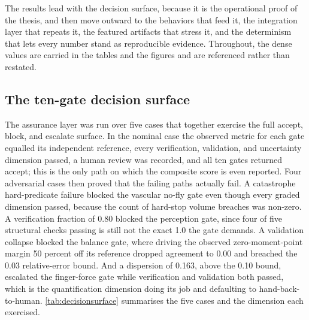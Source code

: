 
The results lead with the decision surface, because it is the operational proof
of the thesis, and then move outward to the behaviors that feed it, the
integration layer that repeats it, the featured artifacts that stress it, and the
determinism that lets every number stand as reproducible evidence. Throughout,
the dense values are carried in the tables and the figures and are referenced
rather than restated.

\subsection{The ten-gate decision surface}

The assurance layer was run over five cases that together exercise the full
accept, block, and escalate surface. In the nominal case the observed metric for
each gate equalled its independent reference, every verification, validation, and
uncertainty dimension passed, a human review was recorded, and all ten gates
returned accept; this is the only path on which the composite score is even
reported. Four adversarial cases then proved that the failing paths actually
fail. A catastrophe hard-predicate failure blocked the vascular no-fly gate even
though every graded dimension passed, because the count of hard-stop volume
breaches was non-zero. A verification fraction of 0.80 blocked the perception
gate, since four of five structural checks passing is still not the exact 1.0 the
gate demands. A validation collapse blocked the balance gate, where driving the
observed zero-moment-point margin 50 percent off its reference dropped agreement
to 0.00 and breached the 0.03 relative-error bound. And a dispersion of 0.163,
above the 0.10 bound, escalated the finger-force gate while verification and
validation both passed, which is the quantification dimension doing its job and
defaulting to hand-back-to-human. \autoref{tab:decisionsurface} summarises the
five cases and the dimension each exercised.

